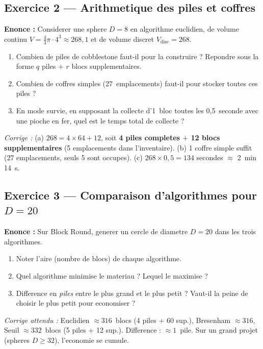 \documentclass[12pt,a4paper]{scrartcl}
\newcommand{\acc}[1]{\textcolor{accent}{\textbf{#1}}}
\begin{document}
\subsection*{Exercice 2 --- Arithmetique des piles et coffres}
\textbf{Enonce :} Considerer une sphere $D = 8$ en algorithme euclidien, de volume continu $V = \tfrac{4}{3}\pi \cdot 4^3 \approx 268{,}1$ et de volume discret $V_{\mathrm{disc}} = 268$.
\begin{enumerate}[label=\alph*),leftmargin=1.5em,itemsep=0.1em,topsep=0.2em,nosep]
  \item Combien de piles de cobblestone faut-il pour la construire ? Repondre sous la forme $q$ piles $+$ $r$ blocs supplementaires.
  \item Combien de coffres simples (27~emplacements) faut-il pour stocker toutes ces piles ?
  \item En mode survie, en supposant la collecte d'1~bloc toutes les 0{,}5~seconde avec une pioche en fer, quel est le temps total de collecte ?
\end{enumerate}

\emph{Corrige :} (a) $268 = 4 \times 64 + 12$, soit \acc{4 piles completes $+$ 12 blocs supplementaires} (5 emplacements dans l'inventaire). (b) 1 coffre simple suffit (27 emplacements, seuls 5 sont occupes). (c) $268 \times 0{,}5 = 134$ secondes $\approx$ 2~min 14~s.

\subsection*{Exercice 3 --- Comparaison d'algorithmes pour $D=20$}
\textbf{Enonce :} Sur Block Round, generer un cercle de diametre $D = 20$ dans les trois algorithmes.
\begin{enumerate}[label=\alph*),leftmargin=1.5em,itemsep=0.1em,topsep=0.2em,nosep]
  \item Noter l'aire (nombre de blocs) de chaque algorithme.
  \item Quel algorithme minimise le materiau ? Lequel le maximise ?
  \item Difference en \emph{piles} entre le plus grand et le plus petit ? Vaut-il la peine de choisir le plus petit pour economiser ?
\end{enumerate}

\emph{Corrige attendu :} Euclidien $\approx 316$~blocs (4 piles + 60 sup.), Bresenham $\approx 316$, Seuil $\approx 332$~blocs (5 piles + 12 sup.). Difference : $\approx 1$~pile. Sur un grand projet (spheres $D \geq 32$), l'economie se cumule.
\end{document}
